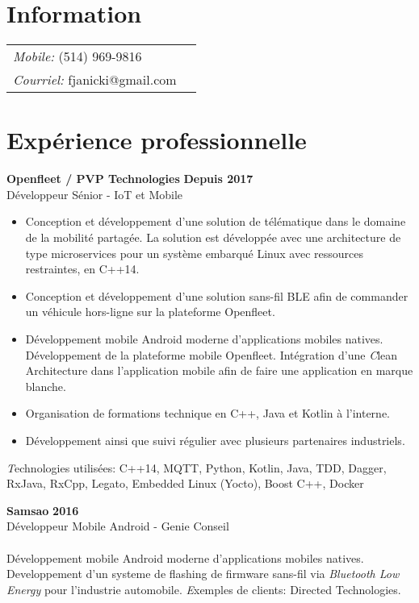 \documentclass[margin,line]{res}
\begin{document}

\begin{resume}
  \section{\sc Information}
  \vspace{.05in}
  \begin{tabular}{@{}p{2in}p{4in}}
    {\it Mobile:}  (514) 969-9816      \\
    {\it Courriel:} fjanicki@gmail.com \\
  \end{tabular}

  \section{\sc Expérience professionnelle}
   {\bf Openfleet / PVP Technologies} \hfill {\bf Depuis 2017}\\
  Développeur Sénior - IoT et Mobile\\
  \begin{itemize}
    \item Conception et développement d'une solution de télématique dans le domaine de la mobilité partagée. La solution est développée avec une architecture de type microservices pour un système embarqué Linux avec ressources restraintes, en C++14.
    \item Conception et développement d'une solution sans-fil BLE afin de commander un véhicule hors-ligne sur la plateforme Openfleet.
    \item Développement mobile Android moderne d'applications mobiles natives. Développement de la plateforme mobile Openfleet. Intégration d'une {\emph Clean Architecture} dans l'application mobile afin de faire une application en marque blanche.
    \item Organisation de formations technique en C++, Java et Kotlin à l'interne.
    \item Développement ainsi que suivi régulier avec plusieurs partenaires industriels.
  \end{itemize}

  {\emph Technologies utilisées:} C++14, MQTT, Python, Kotlin, Java, TDD, Dagger, RxJava, RxCpp, Legato, Embedded Linux (Yocto), Boost C++, Docker

    {\bf Samsao} \hfill {\bf 2016}\\
  Développeur Mobile Android - Genie Conseil\\\\
  Développement mobile Android moderne d'applications mobiles natives. Developpement d'un systeme de flashing de firmware sans-fil via \emph{Bluetooth Low Energy} pour l'industrie automobile.
    {\emph Exemples de clients:} Directed Technologies.


\end{resume}
\end{document}
